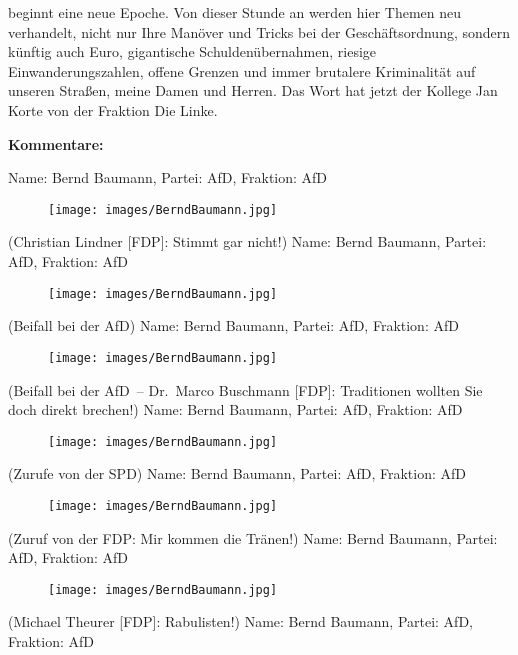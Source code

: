 \documentclass[10pt, a4paper]{report}
\begin{document}
beginnt eine neue Epoche. Von dieser Stunde an werden hier Themen neu verhandelt, nicht nur Ihre Manöver und Tricks bei der Geschäftsordnung, sondern künftig auch Euro, gigantische Schuldenübernahmen, riesige Einwanderungszahlen, offene Grenzen und immer brutalere Kriminalität auf unseren Straßen, meine Damen und Herren. Das Wort hat jetzt der Kollege Jan Korte von der Fraktion Die Linke. 

\textbf{Kommentare:}

Name: Bernd Baumann, Partei: AfD, Fraktion: AfD

\begin{figure}[!ht]
\texttt{[image: images/BerndBaumann.jpg]}
\end{figure}


(Christian Lindner [FDP]: Stimmt gar nicht!)
Name: Bernd Baumann, Partei: AfD, Fraktion: AfD

\begin{figure}[!ht]
\texttt{[image: images/BerndBaumann.jpg]}
\end{figure}


(Beifall bei der AfD)
Name: Bernd Baumann, Partei: AfD, Fraktion: AfD

\begin{figure}[!ht]
\texttt{[image: images/BerndBaumann.jpg]}
\end{figure}


(Beifall bei der AfD – Dr. Marco Buschmann [FDP]: Traditionen wollten Sie doch direkt brechen!)
Name: Bernd Baumann, Partei: AfD, Fraktion: AfD

\begin{figure}[!ht]
\texttt{[image: images/BerndBaumann.jpg]}
\end{figure}


(Zurufe von der SPD)
Name: Bernd Baumann, Partei: AfD, Fraktion: AfD

\begin{figure}[!ht]
\texttt{[image: images/BerndBaumann.jpg]}
\end{figure}


(Zuruf von der FDP: Mir kommen die Tränen!)
Name: Bernd Baumann, Partei: AfD, Fraktion: AfD

\begin{figure}[!ht]
\texttt{[image: images/BerndBaumann.jpg]}
\end{figure}


(Michael Theurer [FDP]: Rabulisten!)
Name: Bernd Baumann, Partei: AfD, Fraktion: AfD
\end{document}
